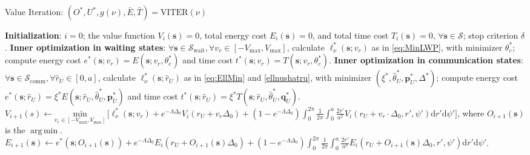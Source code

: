 \documentclass[12pt, draftcls, onecolumn]{IEEEtran}
\theoremstyle{plain}
\theoremstyle{definition}
\theoremstyle{remark}
\DeclareMathOperator*{\argmin}{arg\,min}
\begin{document}
\begin{algorithm}[t]
\caption{Value Iteration: $(O^{*},U^{*},g(\nu),\bar{E},\bar{T})=\mathrm{VITER}(\nu)$}\label{A1}
    \begin{algorithmic}[1]
        \scriptsize
        \State \textbf{Initialization}: $i{=}0$; the value function $V_{i}(\mathbf{s}){=}0$, total energy cost $E_{i}(\mathbf{s}){=}0$, and total time cost $T_{i}(\mathbf{s}){=}0$, ${\forall}\mathbf{s}{\in}\mathcal{S}$; stop criterion $\delta$.
        \vspace{0.1cm}
    	\State \textbf{Inner optimization in waiting states}: ${\forall}\mathbf{s}{\in}\mathcal{S}_{\mathrm{wait}}, {\forall}v_{r}{\in}[-V_{\mathrm{max}},V_{\mathrm{max}}]$, calculate $\ell_{\nu}^{*}(\mathbf{s};v_{r})$ as in \eqref{eq:MinLWP}, with minimizer $\theta_{c}^{*}$; compute energy cost $e^{*}(\mathbf{s};v_{r}){=}E(\mathbf{s};v_{r},\theta_{c}^*)$ and time cost $t^{*}(\mathbf{s};v_r){=}T(\mathbf{s};v_{r},\theta_{c}^{*})$.
    	\vspace{0.1cm}
    	\State \textbf{Inner optimization in communication states}: ${\forall}\mathbf{s}{\in}\mathcal{S}_{\mathrm{comm}}, {\forall}\hat{r}_{U}{\in}[0,a]$, calculate $\ell_{\nu}^{*}(\mathbf{s};\hat{r}_{U})$ as in \eqref{eq:EllMin} and \eqref{ellnushatru}, with minimizer $(\xi^{*},\hat{\theta}_{U}^{*},\mathbf{p}_{U}^{*},\Delta^{*})$; compute energy cost $e^{*}(\mathbf{s};\hat{r}_{U}){=}\xi^{*}E(\mathbf{s};\hat{r}_{U},\hat{\theta}_{U}^{*},\mathbf{p}_{U}^{*})$ and time cost $t^{*}(\mathbf{s};\hat{r}_{U}){=}\xi^{*}T(\mathbf{s};\hat{r}_{U},\hat{\theta}_{U}^{*},\mathbf{q}_{U}^{*})$.
    	\vspace{0.1cm}
        \Repeat
            \vspace{0.1cm}
        	    \vspace{0.1cm}
        		\State $V_{i{+}1}(s){\gets}\underset{v_{r}{\in}[-V_{\mathrm{max}},V_{\mathrm{max}}]}{\mathrm{min}}\, \big[\ell_{\nu}^{*}(\mathbf{s};v_{r}){+}e^{-\Lambda\Delta_{0}}V_{i}(r_{U}{+}v_{r}\Delta_{0}){+} \left(1{-}e^{-\Lambda\Delta_{0}}\right)\int_{0}^{2\pi}\frac{1}{2\pi}\int_{0}^{a}\frac{2r'}{a^{2}}V_{i}(r_{U}{+}v_{r}{\cdot}\Delta_{0},r',\psi')\mathrm{d}r'\mathrm{d}\psi'\big]$,
        		\vspace{0.1cm}
        		\Statex \hspace{2.0cm} where $O_{i{+}1}(\mathbf{s})$ is the $\argmin$.
        		\vspace{0.1cm}
        		\State $E_{i{+}1}(\mathbf{s}){\gets}e^{*}(\mathbf{s};O_{i{+}1}(\mathbf{s})){+}e^{-\Lambda\Delta_{0}}E_{i}(r_{U}{+}O_{i{+}1}(\mathbf{s})\Delta_{0}){+}\left(1{-}e^{-\Lambda\Delta_{0}}\right)\int_{0}^{2\pi}\frac{1}{2\pi}\int_{0}^{a}\frac{2r'}{a^{2}}E_{i}(r_{U}{+}O_{i{+}1}(\mathbf{s})\Delta_{0},r',\psi')\mathrm{d}r'\mathrm{d}\psi'$.

\end{algorithmic}
\end{algorithm}
\end{document}
